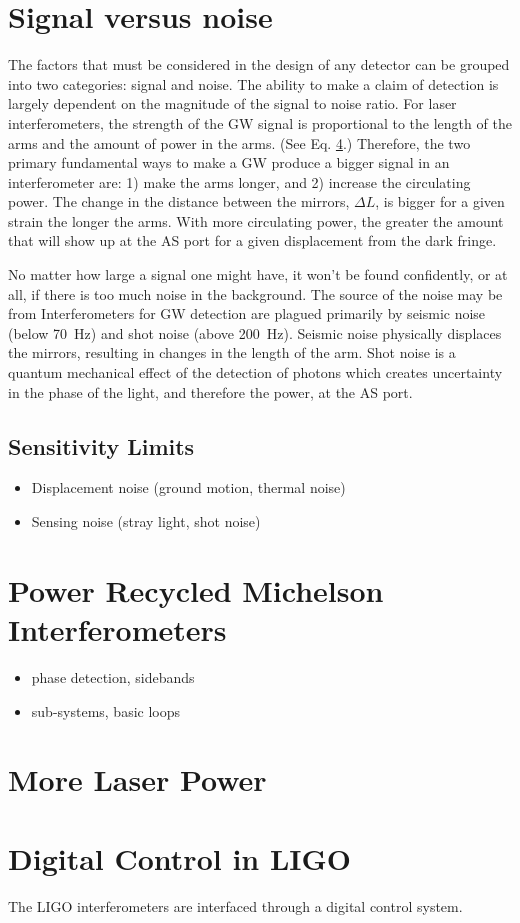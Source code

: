 \section{Signal versus noise}
The factors that must be considered in the design of any detector can
be grouped into two categories: signal and noise. The ability to make
a claim of detection is largely dependent on the magnitude of the
signal to noise ratio. For laser interferometers, the strength of the
GW signal is proportional to the length of the arms and the amount of
power in the arms. (See Eq. \ref{}.) Therefore, the two primary
fundamental ways to make a GW produce a bigger signal in an
interferometer are: 1) make the arms longer, and 2) increase the
circulating power. The change in the distance between the mirrors,
$\Delta L$, is bigger for a given strain the longer the arms. With
more circulating power, the greater the amount that will show up at
the AS port for a given displacement from the dark fringe.

No matter how large a signal one might have, it won't be found
confidently, or at all, if there is too much noise in the
background. The source of the noise may be from  Interferometers for GW detection are plagued primarily by
seismic noise (below 70~Hz) and shot noise (above 200~Hz). Seismic
noise physically displaces the mirrors, resulting in changes in the
length of the arm. Shot noise is a quantum mechanical effect of the
detection of photons which creates uncertainty in the phase of the
light, and therefore the power, at the AS port.


\subsection{Sensitivity Limits}
\begin{itemize}
\item Displacement noise (ground motion, thermal noise)
\item Sensing noise (stray light, shot noise)
\end{itemize}




\section{Power Recycled Michelson Interferometers}
\begin{itemize}
\item phase detection, sidebands
\item sub-systems, basic loops
\end{itemize}




\section{More Laser Power}




\section{Digital Control in LIGO}
The LIGO interferometers are interfaced through a digital control
system. 

